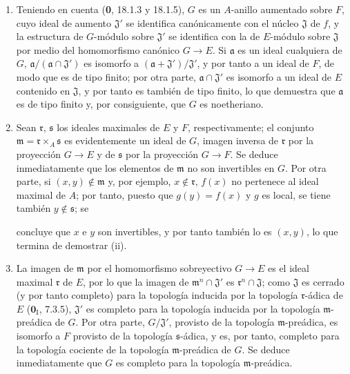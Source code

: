 \begin{enumerate}
  \item[(i)] Teniendo en cuenta (\textbf{0}, 18.1.3 y 18.1.5), $G$ es un $A$-anillo aumentado sobre $F$, cuyo ideal de aumento $\mathfrak J'$ se identifica canónicamente con el núcleo $\mathfrak J$ de $f$, y la estructura de $G$-módulo sobre $\mathfrak J'$ se identifica con la de $E$-módulo sobre $\mathfrak J$ por medio del homomorfismo canónico $G\to E$. Si $\mathfrak a$ es un ideal cualquiera de $G$, $\mathfrak a/(\mathfrak a\cap\mathfrak J')$ es isomorfo a $(\mathfrak a+\mathfrak J')/\mathfrak J'$, y por tanto a un ideal de $F$, de modo que es de tipo finito; por otra parte, $\mathfrak a\cap\mathfrak J'$ es isomorfo a un ideal de $E$ contenido en $\mathfrak J$, y por tanto es también de tipo finito, lo que demuestra que $\mathfrak a$ es de tipo finito y, por consiguiente, que $G$ es noetheriano.
  \item[(ii)] Sean $\mathfrak r$, $\mathfrak s$ los ideales maximales de $E$ y $F$, respectivamente; el conjunto $\mathfrak m=\mathfrak r\times_A\mathfrak s$ es evidentemente un ideal de $G$, imagen inversa de $\mathfrak r$ por la proyección $G\to E$ y de $\mathfrak s$ por la proyección $G\to F$. Se deduce inmediatamente que los elementos de $\mathfrak m$ no son invertibles en $G$. Por otra parte, si $(x,y)\notin\mathfrak m$ y, por ejemplo, $x\notin\mathfrak r$, $f(x)$ no pertenece al ideal maximal de $A$; por tanto, puesto que $g(y)=f(x)$ y $g$ es local, se tiene también $y\notin\mathfrak s$; se


concluye que $x$ e $y$ son invertibles, y por tanto también lo es $(x,y)$, lo que termina de demostrar (ii).
  \item[(iii)] La imagen de $\mathfrak m$ por el homomorfismo sobreyectivo $G\to E$ es el ideal maximal $\mathfrak r$ de $E$, por lo que la imagen de $\mathfrak m^n\cap\mathfrak J'$ es $\mathfrak r^n\cap\mathfrak J$; como $\mathfrak J$ es cerrado (y por tanto completo) para la topología inducida por la topología $\mathfrak r$-ádica de $E$ ($\mathbf{0}_{\mathrm I}$, 7.3.5), $\mathfrak J'$ es completo para la topología inducida por la topología $\mathfrak m$-preádica de $G$. Por otra parte, $G/\mathfrak J'$, provisto de la topología $\mathfrak m$-preádica, es isomorfo a $F$ provisto de la topología $\mathfrak s$-ádica, y es, por tanto, completo para la topología cociente de la topología $\mathfrak m$-preádica de $G$. Se deduce inmediatamente que $G$ es completo para la topología $\mathfrak m$-preádica.
\end{enumerate}

